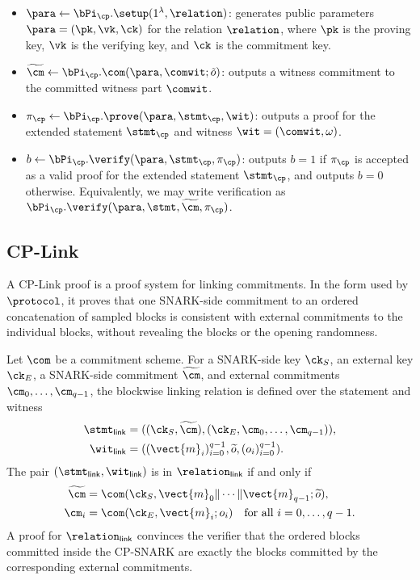 \begin{itemize}
    \item $\para \gets \bPi_{\cp}.\setup(1^\lambda,\relation)$: generates public parameters $\para=(\pk,\vk,\ck)$ for the relation $\relation$, where $\pk$ is the proving key, $\vk$ is the verifying key, and $\ck$ is the commitment key.

    \item $\widetilde{\cm} \gets \bPi_{\cp}.\com(\para,\comwit;\tilde{o})$:
    outputs a witness commitment to the committed witness part $\comwit$.

    \item $\pi_{\cp} \gets \bPi_{\cp}.\prove(\para,\stmt_{\cp},\wit)$:
    outputs a proof for the extended statement $\stmt_{\cp}$ and witness
    $\wit=(\comwit,\omega)$.

    \item $b \gets \bPi_{\cp}.\verify(\para,\stmt_{\cp},\pi_{\cp})$:
    outputs $b=1$ if $\pi_{\cp}$ is accepted as a valid proof for the extended
    statement $\stmt_{\cp}$, and outputs $b=0$ otherwise. Equivalently, we may
    write verification as
    $\bPi_{\cp}.\verify(\para,\stmt,\widetilde{\cm},\pi_{\cp})$.
\end{itemize}
\subsection{CP-Link}
\label{sec:prelim-cplink}

A CP-Link proof is a proof system for linking commitments.  In the form used by
\(\protocol\), it proves that one SNARK-side commitment to an ordered
concatenation of sampled blocks is consistent with external commitments to the
individual blocks, without revealing the blocks or the opening randomness.

Let $\com$ be a commitment scheme.  For a SNARK-side key \(\ck_S\), an external
key \(\ck_E\), a SNARK-side commitment \(\widetilde{\cm}\), and external
commitments \(\cm_0,\ldots,\cm_{q-1}\), the blockwise linking relation is
defined over the statement and witness
\[
\begin{aligned}
\stmt_{\mathsf{link}}
&=
((\ck_S,\widetilde{\cm}),
(\ck_E,\cm_0,\ldots,\cm_{q-1})),\\
\wit_{\mathsf{link}}
&=
((\vect{m}_i)_{i=0}^{q-1},\widetilde{o},(o_i)_{i=0}^{q-1}).
\end{aligned}
\]
The pair \((\stmt_{\mathsf{link}},\wit_{\mathsf{link}})\) is in
\(\relation_{\mathsf{link}}\) if and only if
\[
\begin{aligned}
\widetilde{\cm}
&=
\com(\ck_S,\vect{m}_0\|\cdots\|\vect{m}_{q-1};\widetilde{o}),\\
\cm_i
&=
\com(\ck_E,\vect{m}_i;o_i)
\quad \text{for all } i=0,\ldots,q-1.
\end{aligned}
\]
A proof for $\relation_{\mathsf{link}}$ convinces the verifier that the ordered
blocks committed inside the CP-SNARK are exactly the blocks committed by the
corresponding external commitments.

